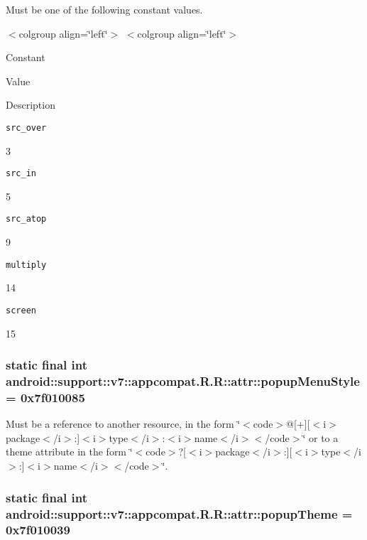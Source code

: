 Must be one of the following constant values. \begin{TabularC}{0}
\hline
\end{TabularC}
$<$colgroup align=\char`\"{}left\char`\"{}$>$ $<$colgroup align=\char`\"{}left\char`\"{}$>$ 

Constant

Value

Description 

{\tt src\_\-over}

3

{\tt src\_\-in}

5

{\tt src\_\-atop}

9

{\tt multiply}

14

{\tt screen}

15\hypertarget{classandroid_1_1support_1_1v7_1_1appcompat_1_1_r_1_1attr_9fa945362e4a2101255061a3958f519e}{
\subsubsection[{popupMenuStyle}]{\setlength{\rightskip}{0pt plus 5cm}static final int android::support::v7::appcompat.R.R::attr::popupMenuStyle = 0x7f010085}}
\label{classandroid_1_1support_1_1v7_1_1appcompat_1_1_r_1_1attr_9fa945362e4a2101255061a3958f519e}


Must be a reference to another resource, in the form \char`\"{}$<$code$>$@\mbox{[}+\mbox{]}\mbox{[}$<$i$>$package$<$/i$>$:\mbox{]}$<$i$>$type$<$/i$>$:$<$i$>$name$<$/i$>$$<$/code$>$\char`\"{} or to a theme attribute in the form \char`\"{}$<$code$>$?\mbox{[}$<$i$>$package$<$/i$>$:\mbox{]}\mbox{[}$<$i$>$type$<$/i$>$:\mbox{]}$<$i$>$name$<$/i$>$$<$/code$>$\char`\"{}. \hypertarget{classandroid_1_1support_1_1v7_1_1appcompat_1_1_r_1_1attr_2054dd0e6e8473bdb2c46b6bf341c3e9}{
\subsubsection[{popupTheme}]{\setlength{\rightskip}{0pt plus 5cm}static final int android::support::v7::appcompat.R.R::attr::popupTheme = 0x7f010039}}
\label{classandroid_1_1support_1_1v7_1_1appcompat_1_1_r_1_1attr_2054dd0e6e8473bdb2c46b6bf341c3e9}


